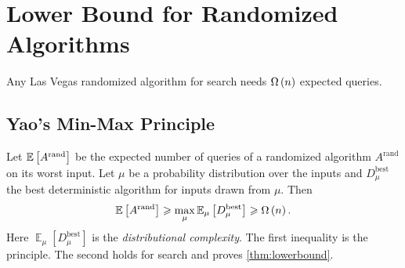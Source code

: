 \section{Lower Bound for Randomized Algorithms}

\begin{theorem}\label{thm:lowerbound}
    Any Las Vegas randomized algorithm for search needs $\Omega\left(n\right)$ expected queries.
\end{theorem}

\subsection*{Yao's Min-Max Principle}

Let $\expectation{A^{\mathrm{rand}}}$ be the expected number of queries of a randomized algorithm
$A^{\mathrm{rand}}$ on its worst input. Let $\mu$ be a probability distribution over the inputs and
$D^{\mathrm{best}}_{\mu}$ the best deterministic algorithm for inputs drawn from $\mu$. Then
\[\expectation{A^{\mathrm{rand}}}
    \geq \max_{\mu} \operatorname{\mathbb{E}}_{\mu}\left[D^{\mathrm{best}}_{\mu}\right]
    \geq \bigOm{n}.\]
Here $\operatorname{\mathbb{E}}_{\mu}\left[D^{\mathrm{best}}_{\mu}\right]$ is the
\emph{distributional complexity}. The first inequality is the principle. The second holds for
search and proves \cref{thm:lowerbound}.

